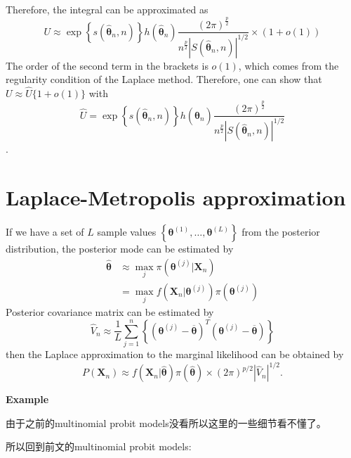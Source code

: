 \documentclass[
]{book}
\theoremstyle{definition}
\theoremstyle{definition}
\theoremstyle{definition}
\theoremstyle{remark}
\begin{document}
Therefore, the integral can be approximated as
\[
U \approx \exp \left\{s\left(\hat{\boldsymbol{\theta}}_{n}, n\right)\right\} h\left(\hat{\boldsymbol{\theta}}_{n}\right) \frac{(2 \pi)^{\frac{p}{2}}}{n^{\frac{p}{2}}\left|S\left(\hat{\boldsymbol{\theta}}_{n}, n\right)\right|^{1 / 2}} \times(1+o(1))
\]
The order of the second term in the brackets is \(o(1)\), which comes from the regularity condition of the Laplace method. Therefore, one can show that \(U \approx \hat{U}\{1+o(1)\}\) with
\[
\hat{U}=\exp \left\{s\left(\hat{\boldsymbol{\theta}}_{n}, n\right)\right\} h\left(\hat{\boldsymbol{\theta}}_{n}\right) \frac{(2 \pi)^{\frac{p}{2}}}{n^{\frac{p}{2}}\left|S\left(\hat{\boldsymbol{\theta}}_{n}, n\right)\right|^{1 / 2}}
\]
.

\hypertarget{laplace-metropolis-approximation-1}{%
\section{Laplace-Metropolis approximation}\label{laplace-metropolis-approximation-1}}

If we have a set of \(L\) sample values \(\left\{\boldsymbol{\theta}^{(1)}, \ldots, \boldsymbol{\theta}^{(L)}\right\}\) from the posterior distribution, the posterior mode can be estimated by
\[
\begin{aligned} \hat{\boldsymbol{\theta}} & \approx \max _{j} \pi\left(\boldsymbol{\theta}^{(j)} | \boldsymbol{X}_{n}\right) \\ &=\max _{j} f\left(\boldsymbol{X}_{n} | \boldsymbol{\theta}^{(j)}\right) \pi\left(\boldsymbol{\theta}^{(j)}\right) \end{aligned}
\]
Posterior covariance matrix can be estimated by
\[
\hat{V}_{n} \approx \frac{1}{L} \sum_{j=1}^{n}\left\{\left(\boldsymbol{\theta}^{(j)}-\overline{\boldsymbol{\theta}}\right)^{T}\left(\boldsymbol{\theta}^{(j)}-\overline{\boldsymbol{\theta}}\right)\right\}
\]
then the Laplace approximation to the marginal likelihood can be obtained by
\[
P\left(\boldsymbol{X}_{n}\right) \approx f\left(\boldsymbol{X}_{n} | \hat{\boldsymbol{\theta}}\right) \pi(\hat{\boldsymbol{\theta}}) \times(2 \pi)^{p / 2}\left|\hat{V}_{n}\right|^{1 / 2}.
\]

\textbf{Example}

由于之前的multinomial probit models没看所以这里的一些细节看不懂了。

所以回到前文的multinomial probit models:
\end{document}

